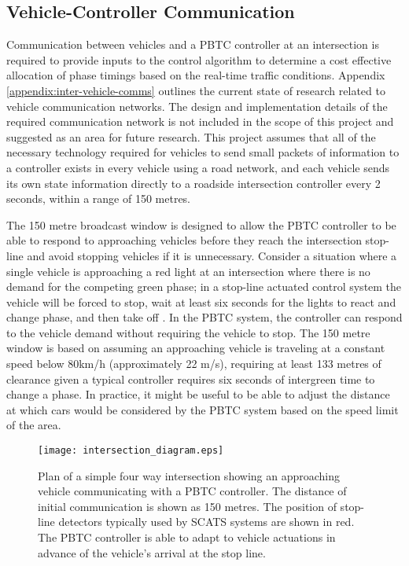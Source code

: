 \subsection{Vehicle-Controller Communication}

Communication between vehicles and a PBTC controller at an intersection is required to provide inputs to the control algorithm to determine a cost effective allocation of phase timings based on the real-time traffic conditions. Appendix \ref{appendix:inter-vehicle-comms} outlines the current state of research related to vehicle communication networks. The design and implementation details of the required communication network is not included in the scope of this project and suggested as an area for future research. This project assumes that all of the necessary technology required for vehicles to send small packets of information to a controller exists in every vehicle using a road network, and each vehicle sends its own state information directly to a roadside intersection controller every 2 seconds, within a range of 150 metres.

The 150 metre broadcast window is designed to allow the PBTC controller to be able to respond to approaching vehicles before they reach the intersection stop-line and avoid stopping vehicles if it is unnecessary. Consider a situation where a single vehicle is approaching a red light at an intersection where there is no demand for the competing green phase; in a stop-line actuated control system the vehicle will be forced to stop, wait at least six seconds for the lights to react and change phase, and then take off \cite{scatstraining}. In the PBTC system, the controller can respond to the vehicle demand without requiring the vehicle to stop. The 150 metre window is based on assuming an approaching vehicle is traveling at a constant speed below 80km/h (approximately 22 m/s), requiring at least 133 metres of clearance given a typical controller requires six seconds of intergreen time to change a phase. In practice, it might be useful to be able to adjust the distance at which cars would be considered by the PBTC system based on the speed limit of the area. 

\begin{figure}[]
\centering
	\texttt{[image: intersection\_diagram.eps]}
	\caption[Plan of a simple four way intersection showing an approaching vehicle communicating with a traffic controller.]{ Plan of a simple four way intersection showing an approaching vehicle communicating with a PBTC controller. The distance of initial communication is shown as 150 metres. The position of stop-line detectors typically used by SCATS systems are shown in red. The PBTC controller is able to adapt to vehicle actuations in advance of the vehicle's arrival at the stop line. }
\label{intersectiondiagram}
\end{figure}

